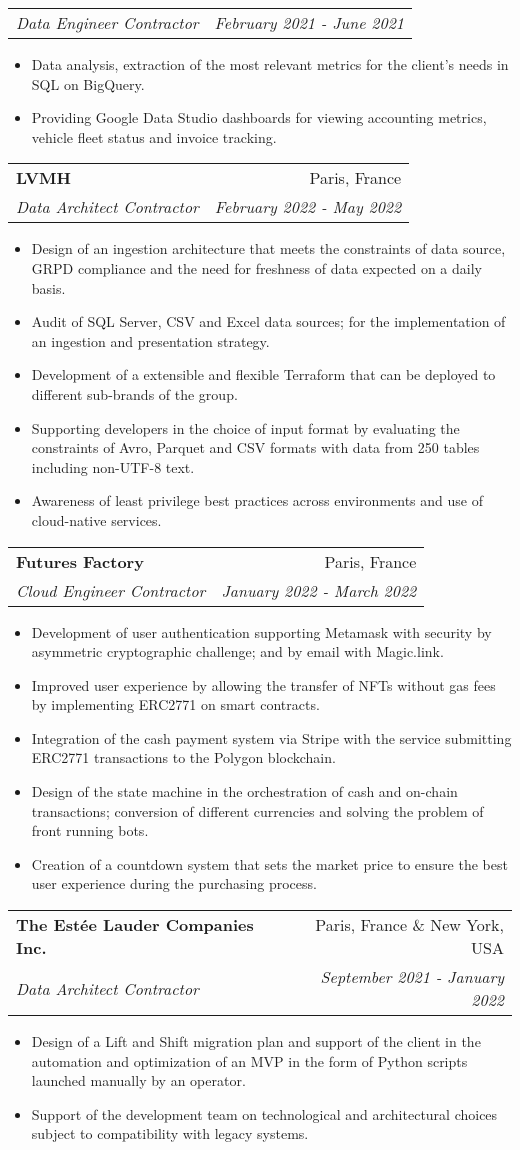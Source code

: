 \documentclass[letterpaper,11pt]{article}
\makeatletter
\newcommand{\resumeItem}[1]{
  \item\small{#1 \vspace{-2pt}}
}
\newcommand{\resumeSubheading}[4]{
  \vspace{-1pt}\item
    \begin{tabular*}{0.97\textwidth}[t]{l@{\extracolsep{\fill}}r}
      \textbf{#1} & #2 \\
      \textit{\small#3} & \textit{\small #4} \\
    \end{tabular*}\vspace{-5pt}
}
\newcommand{\resumeSubSubheading}[2]{
  \begin{tabular*}{0.97\textwidth}{l@{\extracolsep{\fill}}r}
    \textit{\small#1} & \textit{\small #2} \\
  \end{tabular*}\vspace{-5pt}
}
\newcommand{\resumeItemListStart}{\begin{itemize}}
\newcommand{\resumeItemListEnd}{\end{itemize}\vspace{-5pt}}
\makeatother
\begin{document}
\resumeSubSubheading{Data Engineer Contractor}
{February 2021 - June 2021}
\resumeItemListStart{}
\resumeItem{
  Data analysis, extraction of the most relevant metrics for the client's needs in
  SQL on BigQuery.
}
\resumeItem{
  Providing Google Data Studio dashboards for viewing accounting metrics, vehicle
  fleet status and invoice tracking.
}
\resumeItemListEnd{}


\resumeSubheading{LVMH}
{Paris, France}
{Data Architect Contractor}
{February 2022 - May 2022}
\resumeItemListStart{}
\resumeItem{
  Design of an ingestion architecture that meets the constraints of data source,
  GRPD compliance and the need for freshness of data expected on a daily basis.
}
\resumeItem{
  Audit of SQL Server, CSV and Excel data sources; for the implementation of an
  ingestion and presentation strategy.
}
\resumeItem{
  Development of a extensible and flexible Terraform that can be deployed to
  different sub-brands of the group.
}
\resumeItem{
  Supporting developers in the choice of input format by evaluating the
  constraints of Avro, Parquet and CSV formats with data from 250 tables including
  non-UTF-8 text.
}
\resumeItem{
  Awareness of least privilege best practices across environments and use of
  cloud-native services.
}
\resumeItemListEnd{}

\resumeSubheading{Futures Factory}
{Paris, France}
{Cloud Engineer Contractor}
{January 2022 - March 2022}
\resumeItemListStart{}
\resumeItem{
  Development of user authentication supporting Metamask with security by
  asymmetric cryptographic challenge; and by email with Magic.link.
}
\resumeItem{
  Improved user experience by allowing the transfer of NFTs without gas fees by
  implementing ERC2771 on smart contracts.
}
\resumeItem{
  Integration of the cash payment system via Stripe with the service submitting
  ERC2771 transactions to the Polygon blockchain.
}
\resumeItem{
  Design of the state machine in the orchestration of cash and on-chain
  transactions; conversion of different currencies and solving the problem of
  front running bots.
}
\resumeItem{
  Creation of a countdown system that sets the market price to ensure the best
  user experience during the purchasing process.
}
\resumeItemListEnd{}

\resumeSubheading{The Estée Lauder Companies Inc.}
{Paris, France \& New York, USA}
{Data Architect Contractor}
{September 2021 - January 2022}
\resumeItemListStart{}
\resumeItem{
  Design of a Lift and Shift migration plan and support of the client in the
  automation and optimization of an MVP in the form of Python scripts launched
  manually by an operator.
}
\resumeItem{
  Support of the development team on technological and architectural choices
  subject to compatibility with legacy systems.
}
\resumeItemListEnd{}
\end{document}
